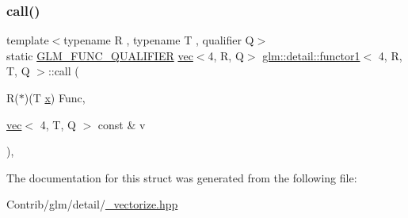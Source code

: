 \subsubsection{\texorpdfstring{call()}{call()}}
{\footnotesize\ttfamily template$<$typename R , typename T , qualifier Q$>$ \\
static \mbox{\hyperlink{setup_8hpp_a33fdea6f91c5f834105f7415e2a64407}{G\+L\+M\+\_\+\+F\+U\+N\+C\+\_\+\+Q\+U\+A\+L\+I\+F\+I\+ER}} \mbox{\hyperlink{structglm_1_1vec}{vec}}$<$4, R, Q$>$ \mbox{\hyperlink{structglm_1_1detail_1_1functor1}{glm\+::detail\+::functor1}}$<$ 4, R, T, Q $>$\+::call (\begin{DoxyParamCaption}\item[{R($\ast$)(T \mbox{\hyperlink{_s_d_l__opengl_8h_ad0e63d0edcdbd3d79554076bf309fd47}{x}})}]{Func,  }\item[{\mbox{\hyperlink{structglm_1_1vec}{vec}}$<$ 4, T, Q $>$ const \&}]{v }\end{DoxyParamCaption})\hspace{0.3cm}{\ttfamily [inline]}, {\ttfamily [static]}}



The documentation for this struct was generated from the following file\+:\begin{DoxyCompactItemize}
\item 
Contrib/glm/detail/\mbox{\hyperlink{__vectorize_8hpp}{\+\_\+vectorize.\+hpp}}\end{DoxyCompactItemize}

